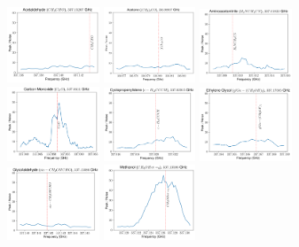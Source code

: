 \documentclass[12pt]{article}
\begin{document}
\begin{figure}
\includegraphics[width=0.245\textwidth]{spw0_CH3CHO}
\includegraphics[width=0.245\textwidth]{spw0_(CH3)2CO}
\includegraphics[width=0.245\textwidth]{spw0_H2NCH2CN}
\includegraphics[width=0.245\textwidth]{spw0_C17O}
\includegraphics[width=0.245\textwidth]{spw0_c-H13CCCH}
\includegraphics[width=0.245\textwidth]{spw0_g'Ga-(CH2OH)2}
\includegraphics[width=0.245\textwidth]{spw0_cis-CH2OHCHO}
\includegraphics[width=0.245\textwidth]{spw0_CH3OHvt=0}

\end{figure}
\end{document}
